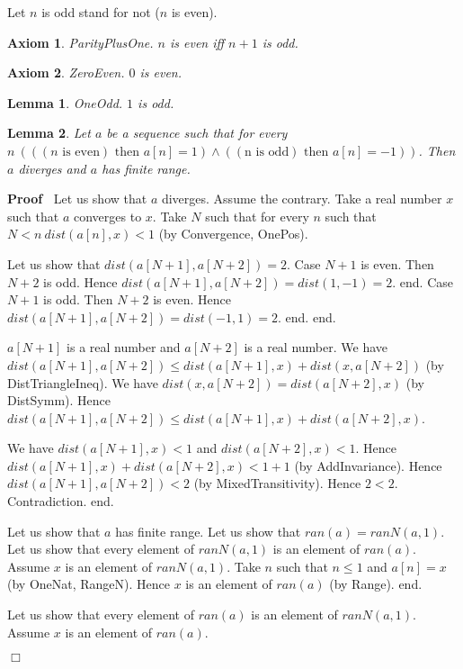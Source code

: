 \documentclass{article}
\newenvironment{forthel}{\begin{leftbar}}{\end{leftbar}}
\newenvironment{proof}{\noindent\textbf{Proof\ }}{\hspace*{\fill}$\Box$\medskip}
\newtheorem{axiom}{Axiom}
\newtheorem{lemma}{Lemma}
\begin{document}
\begin{forthel}
	\noindent Let $n$ is odd stand for not ($n$ is even).
	
	\begin{axiom} ParityPlusOne.
	$n$ is even iff $n + 1$ is odd.
	\end{axiom}

	\begin{axiom} ZeroEven.
	$0$ is even.
	\end{axiom}
	
	\begin{lemma} OneOdd.
	$1$ is odd.
	\end{lemma} 
	
	\begin{lemma}
	Let $a$ be a sequence such that for every $n \ (((n \text{ is even}) \text{ then } a[n] = 1) \wedge ((\text{n is odd}) \text{ then } a[n] = -1))$.
	Then $a$ diverges and $a$ has finite range.
	\end{lemma}
	\begin{proof}
	Let us show that $a$ diverges.
	Assume the contrary.
	Take a real number $x$ such that $a$ converges to $x$.
	Take $N$ such that for every $n$ such that $N < n \ dist(a[n],x) < 1$ (by Convergence, OnePos).
	
	Let us show that $dist(a[N + 1],a[N + 2]) = 2$.
	Case $N + 1$ is even.
	Then $N + 2$ is odd.
	Hence $dist(a[N + 1],a[N + 2]) = dist(1,-1) = 2$.
	end.
	Case $N + 1$ is odd.
	Then $N + 2$ is even.
	Hence $dist(a[N + 1],a[N + 2]) = dist(-1,1) = 2$.
	end.
	end.
	
	$a[N + 1]$ is a real number and $a[N + 2]$ is a real number.
	We have $dist(a[N + 1],a[N + 2]) \leq dist(a[N + 1],x) + dist(x,a[N + 2])$ (by DistTriangleIneq).
	We have $dist(x,a[N + 2]) = dist(a[N + 2],x)$ (by DistSymm).
	Hence $dist(a[N + 1],a[N + 2]) \leq dist(a[N + 1],x) + dist(a[N + 2],x)$.
	
	We have $dist(a[N + 1],x) < 1$ and $dist(a[N + 2],x) < 1$.
	Hence $dist(a[N + 1],x) + dist(a[N + 2],x) < 1 + 1$ (by AddInvariance).
	Hence $dist(a[N + 1],a[N + 2]) < 2$ (by MixedTransitivity).
	Hence $2 < 2$.
	Contradiction.
	end.
	
	Let us show that $a$ has finite range.
	Let us show that $ran(a) = ranN(a,1)$.
	Let us show that every element of $ranN(a,1)$ is an element of $ran(a)$.
	Assume $x$ is an element of $ranN(a,1)$.
	Take $n$ such that $n \leq 1$ and $a[n] = x$ (by OneNat, RangeN).
	Hence $x$ is an element of $ran(a)$ (by Range).
	end.
	
	Let us show that every element of $ran(a)$ is an element of $ranN(a,1)$.
	Assume $x$ is an element of $ran(a)$.
	

\end{proof}
\end{forthel}
\end{document}

